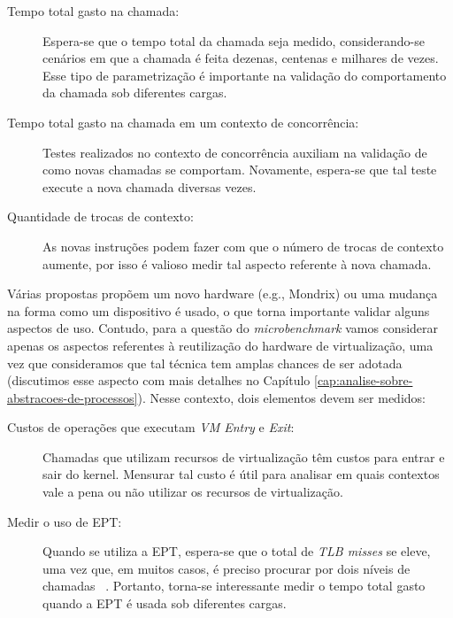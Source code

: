 \begin{description}
  \item [Tempo total gasto na chamada:]

Espera-se que o tempo total da chamada seja medido, considerando-se cenários em
que a chamada é feita dezenas, centenas e milhares de vezes. Esse tipo de
parametrização é importante na validação do comportamento da chamada sob
diferentes cargas.

  \item [Tempo total gasto na chamada em um contexto de concorrência:]

Testes realizados no contexto de concorrência auxiliam na validação de como
novas chamadas se comportam. Novamente, espera-se que tal teste execute
a nova chamada diversas vezes.

  \item [Quantidade de trocas de contexto:]

As novas instruções podem fazer com que o número de trocas de contexto aumente,
por isso é valioso medir tal aspecto referente à nova chamada.

\end{description}

Várias propostas propõem um novo hardware (e.g., Mondrix) ou uma mudança na
forma como um dispositivo é usado, o que torna importante validar alguns
aspectos de uso. Contudo, para a questão do \emph{microbenchmark} vamos
considerar apenas os aspectos referentes à reutilização do hardware de
virtualização, uma vez que consideramos que tal técnica tem amplas chances de
ser adotada (discutimos esse aspecto com mais detalhes no Capítulo
\ref{cap:analise-sobre-abstracoes-de-processos}). Nesse contexto, dois
elementos devem ser medidos:

\begin{description}

  \item [Custos de operações que executam \emph{VM Entry} e \emph{Exit}:]

Chamadas que utilizam recursos de virtualização têm custos para entrar e sair
do kernel. Mensurar tal custo é útil para analisar em quais contextos vale a pena
ou não utilizar os recursos de virtualização.

  \item [Medir o uso de EPT:]

Quando se utiliza a EPT, espera-se que o total de \emph{TLB misses} se eleve,
uma vez que, em muitos casos, é preciso procurar por dois níveis de chamadas
~\citep{belay}. Portanto, torna-se interessante medir o tempo total gasto
quando a EPT é usada sob diferentes cargas.

\end{description}

